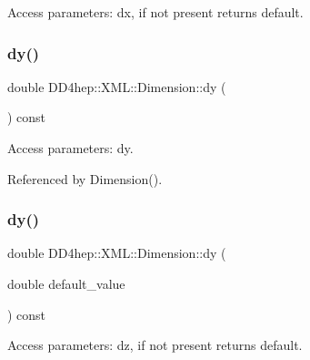 Access parameters\+: dx, if not present returns default. 

\hypertarget{struct_d_d4hep_1_1_x_m_l_1_1_dimension_afdeca8ab0517a67b30a113805bf6a11a}{}\label{struct_d_d4hep_1_1_x_m_l_1_1_dimension_afdeca8ab0517a67b30a113805bf6a11a} 
\subsubsection{\texorpdfstring{dy()}{dy()}\hspace{0.1cm}{\footnotesize\ttfamily [1/2]}}
{\footnotesize\ttfamily double D\+D4hep\+::\+X\+M\+L\+::\+Dimension\+::dy (\begin{DoxyParamCaption}{ }\end{DoxyParamCaption}) const}



Access parameters\+: dy. 



Referenced by Dimension().

\hypertarget{struct_d_d4hep_1_1_x_m_l_1_1_dimension_ac2cf9662f6c8fcc95ed4b4a5a5c58336}{}\label{struct_d_d4hep_1_1_x_m_l_1_1_dimension_ac2cf9662f6c8fcc95ed4b4a5a5c58336} 
\subsubsection{\texorpdfstring{dy()}{dy()}\hspace{0.1cm}{\footnotesize\ttfamily [2/2]}}
{\footnotesize\ttfamily double D\+D4hep\+::\+X\+M\+L\+::\+Dimension\+::dy (\begin{DoxyParamCaption}\item[{double}]{default\+\_\+value }\end{DoxyParamCaption}) const}



Access parameters\+: dz, if not present returns default. 

\hypertarget{struct_d_d4hep_1_1_x_m_l_1_1_dimension_a7467288e1413f603b01f82ec88600030}{}\label{struct_d_d4hep_1_1_x_m_l_1_1_dimension_a7467288e1413f603b01f82ec88600030} 
